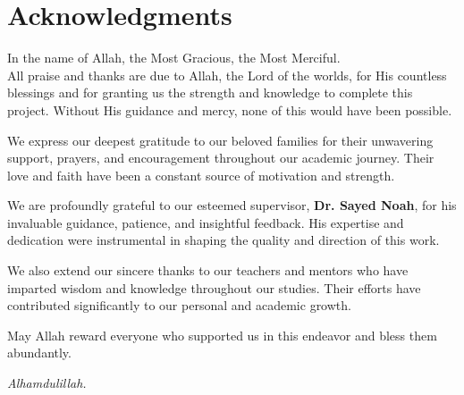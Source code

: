 \chapter*{Acknowledgments}

\vspace{0.5cm}

In the name of Allah, the Most Gracious, the Most Merciful.\\[0.5cm]

All praise and thanks are due to Allah, the Lord of the worlds, for His 
countless blessings and for granting us the strength and knowledge to complete 
this project. Without His guidance and mercy, none of this would have been 
possible.

\vspace{0.5cm}

We express our deepest gratitude to our beloved families for their unwavering 
support, prayers, and encouragement throughout our academic journey. Their love 
and faith have been a constant source of motivation and strength.

\vspace{0.5cm}

We are profoundly grateful to our esteemed supervisor, \textbf{Dr. Sayed Noah}, 
for his invaluable guidance, patience, and insightful feedback. His expertise 
and dedication were instrumental in shaping the quality and direction of this 
work.

\vspace{0.5cm}

We also extend our sincere thanks to our teachers and mentors who have imparted 
wisdom and knowledge throughout our studies. Their efforts have contributed 
significantly to our personal and academic growth.

\vspace{1cm}

May Allah reward everyone who supported us in this endeavor and bless them 
abundantly.

\vspace{0.5cm}

\textit{Alhamdulillah.}

\newpage
